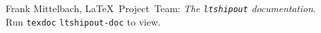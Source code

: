 \documentclass{ltnews}
\providecommand\Dash {\unskip \textemdash}
\begin{document}
\begin{thebibliography}{9}

\fontsize{9.3}{11.3}\selectfont

 Frank Mittelbach, \LaTeX{}~Project~Team:
  \emph{The \texttt{\upshape ltshipout} documentation}.\\
  Run \texttt{texdoc} \texttt{ltshipout-doc} to view.



%
%
%
%
%
\end{thebibliography}
\end{document}
